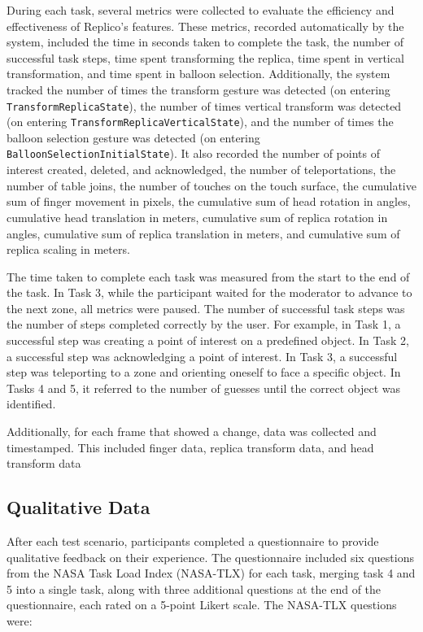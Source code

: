         During each task, several metrics were collected to evaluate the efficiency and effectiveness of Replico's features. These metrics, recorded automatically by the system, included the time in seconds taken to complete the task, the number of successful task steps, time spent transforming the replica, time spent in vertical transformation, and time spent in balloon selection. Additionally, the system tracked the number of times the transform gesture was detected (on entering \lstinline{TransformReplicaState}), the number of times vertical transform was detected (on entering \lstinline{TransformReplicaVerticalState}), and the number of times the balloon selection gesture was detected (on entering \lstinline{BalloonSelectionInitialState}). It also recorded the number of points of interest created, deleted, and acknowledged, the number of teleportations, the number of table joins, the number of touches on the touch surface, the cumulative sum of finger movement in pixels, the cumulative sum of head rotation in angles, cumulative head translation in meters, cumulative sum of replica rotation in angles, cumulative sum of replica translation in meters, and cumulative sum of replica scaling in meters.

        The time taken to complete each task was measured from the start to the end of the task. In Task 3, while the participant waited for the moderator to advance to the next zone, all metrics were paused. The number of successful task steps was the number of steps completed correctly by the user. For example, in Task 1, a successful step was creating a point of interest on a predefined object. In Task 2, a successful step was acknowledging a point of interest. In Task 3, a successful step was teleporting to a zone and orienting oneself to face a specific object. In Tasks 4 and 5, it referred to the number of guesses until the correct object was identified.

        Additionally, for each frame that showed a change, data was collected and timestamped. This included finger data, replica transform data, and head transform data
    
    \subsection{Qualitative Data} \label{sec:qualitative_data}

        After each test scenario, participants completed a questionnaire to provide qualitative feedback on their experience. The questionnaire included six questions from the NASA Task Load Index (NASA-TLX) \cite{hart1988development} for each task, merging task 4 and 5 into a single task, along with three additional questions at the end of the questionnaire, each rated on a 5-point Likert scale. The NASA-TLX questions were:


